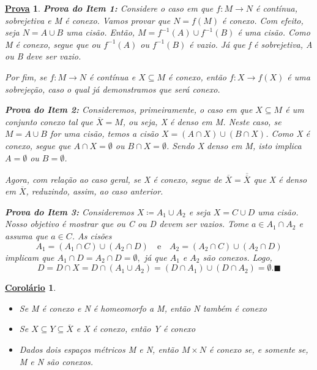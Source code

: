 \documentclass{article}
\newtheorem*{crl*}{\underline{Corolário}}
\newtheorem*{proof*}{\underline{Prova}}
\renewcommand\qedsymbol{$\blacksquare$}
\begin{document}
 \begin{proof*}
\textbf{Prova do Item 1:} Considere o caso em que \(f:M\rightarrow N\) é contínua, sobrejetiva e M é conexo.
Vamos provar que \(N = f(M)\) é conexo. Com efeito, seja \(N=A\cup{B}\) uma cisão.
Então, \(M = f^{-1}(A)\cup f^{-1}(B)\) é uma cisão. Como M é conexo, segue que ou \(f^{-1}(A)\) ou \(f^{-1}(B)\) é vazio.
Já que f é sobrejetiva, A ou B deve ser vazio. 

  Por fim, se \(f:M\rightarrow N\) é contínua e \(X\subseteq{M}\) é conexo, então
\(f:X\rightarrow f(X)\) é uma sobrejeção, caso o qual já demonstramos que será conexo.
  
  \textbf{Prova do Item 2:} Consideremos, primeiramente, o caso em que \(X\subseteq{M}\) é um conjunto conexo tal que
 \(\overline{X} = M\), ou seja, X é denso em M. Neste caso, se \(M = A\cup B\) for uma cisão, temos a cisão
 \(X = (A\cap X)\cup(B\cap X)\). Como X é conexo, segue que \(A\cap X = \emptyset\) ou \(B\cap X = \emptyset\). Sendo X denso
em M, isto implica \(A = \emptyset\) ou \(B = \emptyset\).

  Agora, com relação ao caso geral, se X é conexo, segue de \(\overline{X} = \overline{\overline{X}}\) que X é denso em \(\overline{X}\), reduzindo, assim,
ao caso anterior.

\textbf{Prova do Item 3:} Consideremos \(X\coloneqq A_{1}\cup A_{2}\) e seja \(X = C\cup D\) uma cisão. Nosso objetivo é mostrar que
ou C ou D devem ser vazios. Tome \(a\in A_{1}\cap A_{2}\) e assuma que \(a\in C\). As cisões 
  \[
    A_{1} = (A_{1}\cap C)\cup (A_{2}\cap D)\quad\text{e}\quad A_{2} = (A_{2}\cap C)\cup(A_{2}\cap D)
  \]
  implicam que \(A_{1}\cap D = A_{2}\cap D = \emptyset, \) já que \(A_{1}\) e \(A_{2}\) são conexos. Logo, 
    \[
      D = D\cap X = D\cap(A_{1}\cup A_{2}) = (D\cap A_{1})\cup(D\cap A_{2}) = \emptyset.\text{\qedsymbol} 
    \]
 \end{proof*}
\begin{crl*}
 \begin{itemize}
   \item[1)] Se M é conexo e N é homeomorfo a M, então N também é conexo
   \item[2)] Se \(X\subseteq{Y}\subseteq{\overline{X}}\) e X é conexo, então Y é conexo
   \item[3)] Dados dois espaços métricos M e N, então \(M\times N\) é conexo se, e somente se,
M e N são conexos.
 \end{itemize}
\end{crl*}
\end{document}
